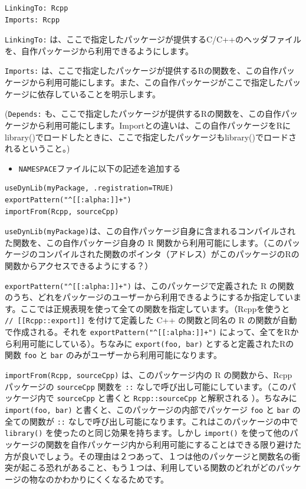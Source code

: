 \documentclass[]{book}
\providecommand{\tightlist}{%
  \setlength{\itemsep}{0pt}\setlength{\parskip}{0pt}}
\begin{document}
\begin{verbatim}
LinkingTo: Rcpp
Imports: Rcpp
\end{verbatim}

\texttt{LinkingTo:} は、ここで指定したパッケージが提供するC/C++のヘッダファイルを、自作パッケージから利用できるようにします。

\texttt{Imports:} は、ここで指定したパッケージが提供するRの関数を、この自作パッケージから利用可能にします。また、この自作パッケージがここで指定したパッケージに依存していることを明示します。

(\texttt{Depends:} も、ここで指定したパッケージが提供するRの関数を、この自作パッケージから利用可能にします。Importとの違いは、この自作パッケージをRにlibrary()でロードしたときに、ここで指定したパッケージもlibrary()でロードされるということ。)

\begin{itemize}
\tightlist
\item
  \texttt{NAMESPACE}ファイルに以下の記述を追加する
\end{itemize}

\begin{verbatim}
useDynLib(myPackage, .registration=TRUE)
exportPattern("^[[:alpha:]]+")
importFrom(Rcpp, sourceCpp)
\end{verbatim}

\texttt{useDynLib(myPackage)}は、この自作パッケージ自身に含まれるコンパイルされた関数を、この自作パッケージ自身の R 関数から利用可能にします。（このパッケージのコンパイルされた関数のポインタ（アドレス）がこのパッケージのRの関数からアクセスできるようにする？）

\texttt{exportPattern("\^{}{[}{[}:alpha:{]}{]}+")} は、このパッケージで定義された R の関数のうち、どれをパッケージのユーザーから利用できるようにするか指定しています。ここでは正規表現を使って全ての関数を指定しています。（Rcppを使うと \texttt{//\ {[}{[}Rcpp::export{]}{]}} を付けて定義した C++ の関数と同名の R の関数が自動で作成される。それを \texttt{exportPattern("\^{}{[}{[}:alpha:{]}{]}+")} によって、全てをRから利用可能にしている）。ちなみに \texttt{export(foo,\ bar)} とすると定義されたRの関数 \texttt{foo} と \texttt{bar} のみがユーザーから利用可能になります。

\texttt{importFrom(Rcpp,\ sourceCpp)} は、このパッケージ内の R の関数から、Rcpp パッケージの \texttt{sourceCpp} 関数を \texttt{::} なしで呼び出し可能にしています。（このパッケージ内で \texttt{sourceCpp} と書くと \texttt{Rcpp::sourceCpp} と解釈される ）。ちなみに \texttt{import(foo,\ bar)} と書くと、このパッケージの内部でパッケージ \texttt{foo} と \texttt{bar} の全ての関数が \texttt{::} なしで呼び出し可能になります。これはこのパッケージの中で \texttt{library()} を使ったのと同じ効果を持ちます。しかし \texttt{import()} を使って他のパッケージの関数を自作パッケージ内から利用可能にすることはできる限り避けた方が良いでしょう。その理由は２つあって、１つは他のパッケージと関数名の衝突が起こる恐れがあること、もう１つは、利用している関数のどれがどのパッケージの物なのかわかりにくくなるためです。
\end{document}
